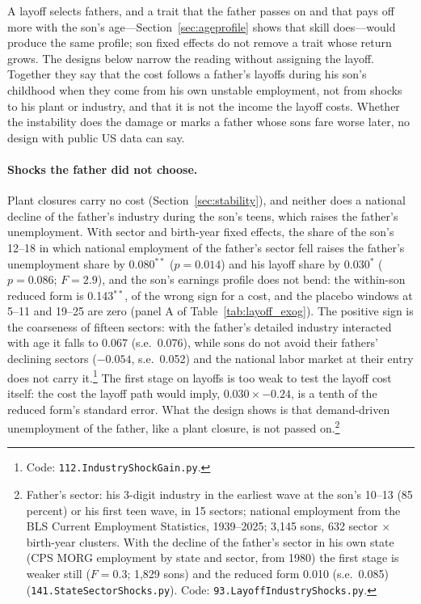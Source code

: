 
A layoff selects fathers, and a trait that the father passes on and that pays off more with the son's age---Section~\ref{sec:ageprofile}
shows that skill does---would produce the same profile; son fixed effects do not remove a trait whose return grows.
The designs below narrow the reading without assigning the layoff. Together they say that the cost follows a father's
layoffs during his son's childhood when they come from his own unstable employment, not from shocks to his plant or
industry, and that it is not the income the layoff costs. Whether the instability does the damage or marks a father
whose sons fare worse later, no design with public US data can say.

\paragraph{Shocks the father did not choose.} Plant closures carry no cost (Section~\ref{sec:stability}), and neither
does a national decline of the father's industry during the son's teens, which raises the father's unemployment. With
sector and birth-year fixed effects, the share of the son's 12--18 in which national employment of the father's sector
fell raises the father's unemployment share by 0.080$^{**}$ ($p = 0.014$) and his layoff share by 0.030$^{*}$ ($p =
0.086$; $F = 2.9$), and the son's earnings profile does not bend: the within-son reduced form is 0.143$^{**}$, of the
wrong sign for a cost, and the placebo windows at 5--11 and 19--25 are zero (panel A of Table~\ref{tab:layoff_exog}).
The positive sign is the coarseness of fifteen sectors: with the father's detailed industry interacted with age it falls
to 0.067 (s.e.\ 0.076), while sons do not avoid their fathers' declining sectors ($-0.054$, s.e.\ 0.052) and the national
labor market at their entry does not carry it.\footnote{Code: \texttt{112.IndustryShockGain.py}.} The
first stage on layoffs is too weak to test the layoff cost itself: the cost the layoff path would imply,
$0.030 \times -0.24$, is a tenth of the reduced form's standard error. What the design shows is that demand-driven
unemployment of the father, like a plant closure, is not passed on.\footnote{Father's sector: his 3-digit industry in the
earliest wave at the son's 10--13 (85 percent) or his first teen wave, in 15 sectors; national employment from the BLS
Current Employment Statistics, 1939--2025; 3,145 sons, 632 sector $\times$ birth-year clusters. With the decline of the
father's sector in his own state (CPS MORG employment by state and sector, from 1980) the first stage is weaker still
($F = 0.3$; 1,829 sons) and the reduced form 0.010 (s.e.\ 0.085) (\texttt{141.StateSectorShocks.py}). Code:
\texttt{93.LayoffIndustryShocks.py}.}

